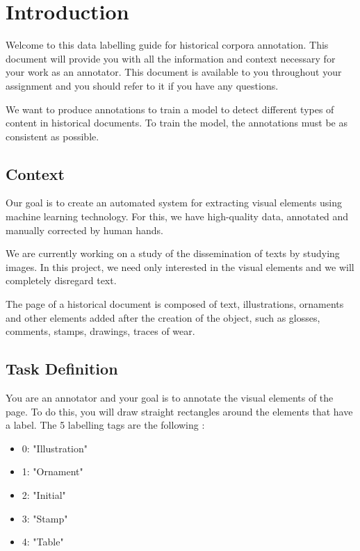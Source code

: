 \hrulefill

\section{Introduction}

Welcome to this data labelling guide for historical corpora annotation. This document will provide you with all the information and context necessary for your work as an annotator. This document is available to you throughout your assignment and you should refer to it if you have any questions.

We want to produce annotations to train a model to detect different types of content in historical documents. To train the model, the annotations must be as consistent as possible.

\subsection{Context}

Our goal is to create an automated system for extracting visual elements using machine learning technology. For this, we have high-quality data, annotated and manually corrected by human hands.

We are currently working on a study of the dissemination of texts by studying images. In this project, we need only interested in the visual elements and we will completely disregard text.

The page of a historical document is composed of text, illustrations, ornaments and other elements added after the creation of the object, such as glosses, comments, stamps, drawings, traces of wear.

\subsection{Task Definition}

You are an annotator and your goal is to annotate the visual elements of the page. To do this, you will draw straight rectangles around the elements that have a label. The 5 labelling tags are the following : 

\begin{itemize}
    \item 0: "Illustration"
    \item 1: "Ornament"
    \item 2: "Initial"
    \item 3: "Stamp"
    \item 4: "Table"
\end{itemize}
